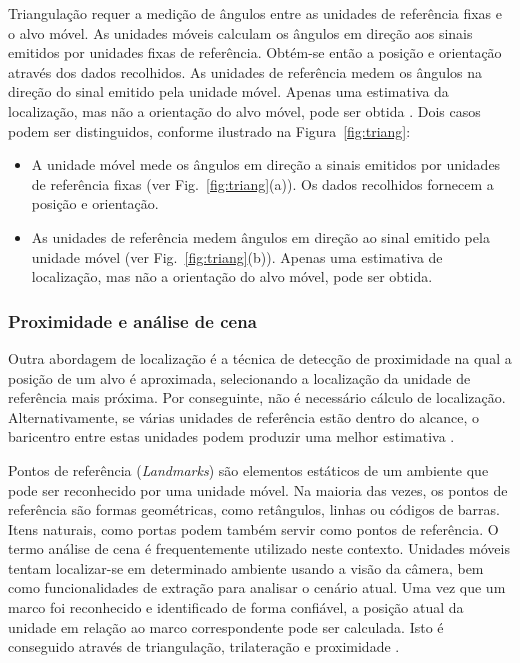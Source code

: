 Triangulação requer a medição de ângulos entre as unidades de referência fixas e o alvo móvel. As unidades móveis calculam os ângulos em direção aos sinais emitidos por unidades fixas de referência. Obtém-se então a posição e orientação através dos dados recolhidos. As unidades de referência medem os ângulos na direção do sinal emitido pela unidade móvel. Apenas uma estimativa da localização, mas não a orientação do alvo móvel, pode ser obtida \cite{lutzke2013experimental}. Dois casos podem ser distinguidos, conforme ilustrado na Figura~\ref{fig:triang}:


\begin{itemize}
  \item A unidade móvel mede os ângulos em direção a sinais emitidos por unidades de referência fixas (ver Fig.~\ref{fig:triang}(a)). Os dados recolhidos fornecem a posição e orientação.
  \item As unidades de referência medem ângulos em direção ao sinal emitido pela unidade móvel (ver Fig.~\ref{fig:triang}(b)). Apenas uma estimativa de localização, mas não a orientação do alvo móvel, pode ser obtida.
 \end{itemize}


\subsubsection{Proximidade e análise de cena}\label{sec:proximidade}
Outra abordagem de localização é a técnica de detecção de proximidade na qual a posição de um alvo é aproximada, selecionando a localização da unidade de referência mais próxima. Por conseguinte, não é necessário cálculo de localização. Alternativamente, se várias unidades de referência estão dentro do alcance, o baricentro entre estas unidades podem produzir uma melhor estimativa \cite{EHuber1996}.

Pontos de referência (\textit{Landmarks}) são elementos estáticos de um ambiente que pode ser reconhecido por uma unidade móvel. Na maioria das vezes, os pontos de referência são formas geométricas, como retângulos, linhas ou códigos de barras. Itens naturais, como portas podem também servir como pontos de referência. O termo  análise de cena é frequentemente utilizado neste contexto. Unidades móveis tentam localizar-se  em determinado ambiente usando a visão da câmera, bem como funcionalidades de extração para analisar o cenário atual. Uma vez que um marco foi reconhecido e identificado de forma confiável, a posição atual da unidade em relação ao marco correspondente pode ser calculada. Isto é conseguido através de triangulação, trilateração e proximidade \cite{linde2006aspects}.

